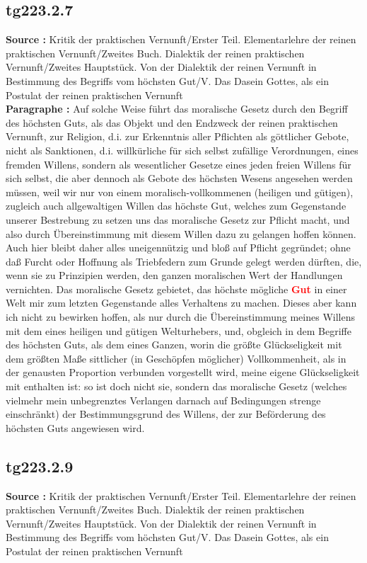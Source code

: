 \documentclass[a4paper,12pt,twoside]{book}
\newcommand{\match}[1]{\textcolor{red}{\textbf{#1}}}
\begin{document}
	\subsection*{tg223.2.7} 
	\textbf{Source : }Kritik der praktischen Vernunft/Erster Teil. Elementarlehre der reinen praktischen Vernunft/Zweites Buch. Dialektik der reinen praktischen Vernunft/Zweites Hauptstück. Von der Dialektik der reinen Vernunft in Bestimmung des Begriffs vom höchsten Gut/V. Das Dasein Gottes, als ein Postulat der reinen praktischen Vernunft\\  
	
	\noindent\textbf{Paragraphe : }
	Auf solche Weise führt das moralische Gesetz durch den Begriff des höchsten Guts, als das Objekt und den Endzweck der reinen praktischen Vernunft, zur Religion, d.i. zur Erkenntnis aller Pflichten als göttlicher Gebote, nicht als Sanktionen, d.i. willkürliche für sich selbst zufällige Verordnungen, eines fremden Willens, sondern als wesentlicher Gesetze eines jeden freien Willens für sich selbst, die aber dennoch als Gebote des höchsten Wesens angesehen werden müssen, weil wir nur von einem moralisch-vollkommenen (heiligen und gütigen), zugleich auch allgewaltigen Willen das höchste Gut, welches zum Gegenstande unserer Bestrebung zu setzen uns das moralische Gesetz zur Pflicht macht, und also durch Übereinstimmung mit diesem Willen dazu zu gelangen hoffen können. Auch hier bleibt daher alles uneigennützig und bloß auf Pflicht gegründet; ohne daß Furcht oder Hoffnung als Triebfedern zum Grunde gelegt werden dürften, die, wenn sie zu Prinzipien werden, den ganzen moralischen Wert der Handlungen vernichten. Das moralische Gesetz gebietet, das höchste mögliche \match{Gut} in einer Welt mir zum letzten Gegenstande alles Verhaltens zu machen. Dieses aber kann ich nicht zu bewirken hoffen, als nur durch die Übereinstimmung meines Willens mit dem eines heiligen und gütigen Welturhebers, und, obgleich in dem Begriffe des höchsten Guts, als dem eines Ganzen, worin die größte Glückseligkeit mit dem größten Maße sittlicher (in Geschöpfen möglicher) Vollkommenheit, als in der genausten Proportion verbunden vorgestellt wird, meine eigene Glückseligkeit mit enthalten ist: so ist doch nicht sie, sondern das moralische Gesetz (welches vielmehr mein unbegrenztes Verlangen darnach auf Bedingungen strenge einschränkt) der Bestimmungsgrund des Willens, der zur Beförderung des höchsten Guts angewiesen wird. 
	
	\subsection*{tg223.2.9} 
	\textbf{Source : }Kritik der praktischen Vernunft/Erster Teil. Elementarlehre der reinen praktischen Vernunft/Zweites Buch. Dialektik der reinen praktischen Vernunft/Zweites Hauptstück. Von der Dialektik der reinen Vernunft in Bestimmung des Begriffs vom höchsten Gut/V. Das Dasein Gottes, als ein Postulat der reinen praktischen Vernunft\\  
	
\end{document}
